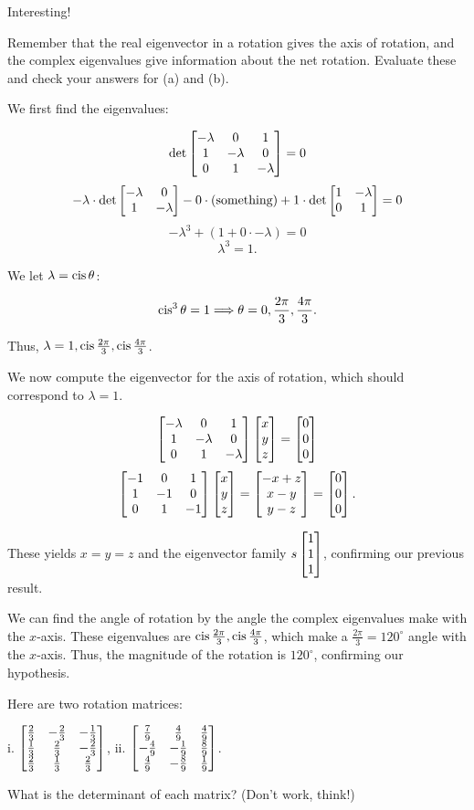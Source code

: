 \documentclass[../gatm_answers.tex]{subfiles}
\begin{document}
{{Interesting!

\begin{inner_problem}
\item Remember that the real eigenvector in a rotation gives the axis of rotation, and the complex eigenvalues give information about the net rotation. Evaluate these and check your answers for (a) and (b).
\end{inner_problem}

We first find the eigenvalues:

$$\det \begin{bmatrix} -\lambda & 0 & 1 \\ 1 & -\lambda & 0 \\ 0 & 1 & -\lambda \end{bmatrix}=0$$
$$-\lambda\cdot \det\begin{bmatrix} -\lambda & 0 \\ 1 & -\lambda \end{bmatrix} - 0\cdot(\text{something}) + 1\cdot \det\begin{bmatrix} 1 & -\lambda \\ 0 & 1 \end{bmatrix}=0$$
$$-\lambda^3 + (1 + 0\cdot -\lambda)=0$$
$$\lambda^3 = 1.$$

We let $\lambda = \operatorname{cis}\theta$:

$$\operatorname{cis}^3\theta=1 \Longrightarrow \theta = 0,\frac{2\pi}{3},\frac{4\pi}{3}.$$

Thus, $\lambda = 1, \operatorname{cis} \frac{2\pi}{3}, \operatorname{cis} \frac{4\pi}{3}$.

We now compute the eigenvector for the axis of rotation, which should correspond to $\lambda = 1$.

$$\begin{bmatrix} -\lambda & 0 & 1 \\ 1 & -\lambda & 0 \\ 0 & 1 & -\lambda \end{bmatrix}\begin{bmatrix} x \\ y \\ z \end{bmatrix} = \begin{bmatrix} 0 \\ 0 \\ 0 \end{bmatrix}$$
$$\begin{bmatrix} -1 & 0 & 1 \\ 1 & -1 & 0 \\ 0 & 1 & -1 \end{bmatrix}\begin{bmatrix} x \\ y \\ z \end{bmatrix} = \begin{bmatrix} -x+z \\ x-y \\ y-z \end{bmatrix} = \begin{bmatrix} 0 \\ 0 \\ 0 \end{bmatrix}.$$

These yields $x=y=z$ and the eigenvector family $s\begin{bmatrix} 1 \\ 1 \\ 1 \end{bmatrix}$, confirming our previous result.

We can find the angle of rotation by the angle the complex eigenvalues make with the $x$-axis. These eigenvalues are $\operatorname{cis} \frac{2\pi}{3}, \operatorname{cis} \frac{4\pi}{3}$, which make a $\frac{2\pi}{3} = 120^\circ$ angle with the $x$-axis. Thus, the magnitude of the rotation is $120^\circ$, confirming our hypothesis.

\begin{outer_problem}
\item Here are two rotation matrices:

i. $\begin{bmatrix} \frac{2}{3} & -\frac{2}{3} & -\frac{1}{3} \\ \frac{1}{3} & \frac{2}{3} & -\frac{2}{3} \\ \frac{2}{3} & \frac{1}{3} & \frac{2}{3} \end{bmatrix}$, ii. $\begin{bmatrix} \frac{7}{9} & \frac{4}{9} & \frac{4}{9} \\ -\frac{4}{9} & -\frac{1}{9} & \frac{8}{9} \\ \frac{4}{9} & -\frac{8}{9} & \frac{1}{9} \end{bmatrix}$.
\end{outer_problem}

\begin{inner_problem}[start=1]
\item What is the determinant of each matrix? (Don't work, think!)
\end{inner_problem}

}}
\end{document}
